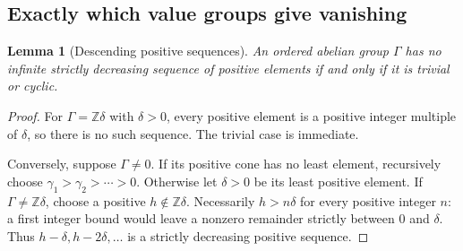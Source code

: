\documentclass[11pt,letterpaper]{article}
\newtheorem{lemma}[lemma]{Lemma}
\theoremstyle{definition}
\theoremstyle{remark}
\newcommand{\Z}{\mathbb Z}
\numberwithin{equation}{section}
\begin{document}
\subsection{Exactly which value groups give vanishing}
\begin{lemma}[Descending positive sequences]\label{lem:descending}
An ordered abelian group $\Gamma$ has no infinite strictly decreasing sequence of positive elements if and only if it is trivial or cyclic.
\end{lemma}
\begin{proof}
For $\Gamma=\Z\delta$ with $\delta>0$, every positive element is a positive integer multiple of $\delta$, so there is no such sequence. The trivial case is immediate.

Conversely, suppose $\Gamma\ne0$. If its positive cone has no least element, recursively choose $\gamma_1>\gamma_2>\cdots>0$. Otherwise let $\delta>0$ be its least positive element. If $\Gamma\ne\Z\delta$, choose a positive $h\notin\Z\delta$. Necessarily $h>n\delta$ for every positive integer $n$: a first integer bound would leave a nonzero remainder strictly between $0$ and $\delta$. Thus $h-\delta,h-2\delta,\ldots$ is a strictly decreasing positive sequence.
\end{proof}
\end{document}
